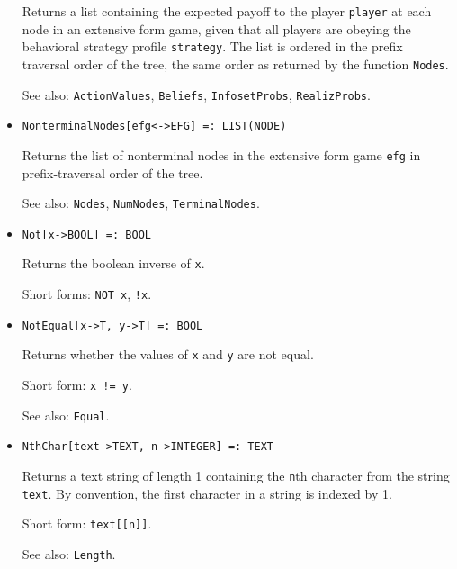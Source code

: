 \begin{itemize}
\bd
Returns a list containing the expected payoff to the player \verb+player+
at each node in an extensive form game, given that all players are obeying
the behavioral strategy profile \verb+strategy+.  The list is ordered
in the prefix traversal order of the tree, the same order as returned
by the function {\tt Nodes}.
\item
[See also:] {\tt ActionValues}, {\tt Beliefs}, {\tt InfosetProbs},
{\tt RealizProbs}.
\ed

\item
\protect \large \begin{verbatim} 
NonterminalNodes[efg<->EFG] =: LIST(NODE)
\end{verbatim}\normalsize

\bd
Returns the list of nonterminal nodes in the extensive form
game \verb+efg+ in prefix-traversal order of the tree.
\item
[See also:] {\tt Nodes}, {\tt NumNodes}, {\tt TerminalNodes}.
\ed

\item
\protect \large \begin{verbatim}
Not[x->BOOL] =: BOOL
\end{verbatim}\normalsize

\bd
Returns the boolean inverse of \verb+x+.
\item
[Short forms:] \verb+NOT x+, \verb+!x+.
\ed

\item
\protect \large \begin{verbatim}
NotEqual[x->T, y->T] =: BOOL
\end{verbatim}\normalsize

\bd
Returns whether the values of \verb+x+ and \verb+y+ are
not equal.
\item
[Short form:] \verb+x != y+.
\item
[See also:] {\tt Equal}.
\ed

\item
\protect \large \begin{verbatim}
NthChar[text->TEXT, n->INTEGER] =: TEXT
\end{verbatim}\normalsize

\bd
Returns a text string of length 1 containing the \verb+n+th
character from the string \verb+text+.  By convention, the first character
in a string is indexed by 1.
\item
[Short form:] \verb+text[[n]]+.
\item
[See also:] {\tt Length}.
\ed


\end{itemize}
